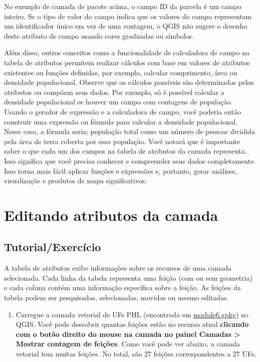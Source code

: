 \documentclass[
]{krantz}
\providecommand{\tightlist}{%
  \setlength{\itemsep}{0pt}\setlength{\parskip}{0pt}}
\begin{document}
No exemplo de camada de pacote acima, o campo ID da parcela é um campo inteiro. Se o tipo de valor do campo indica que os valores do campo representam um identificador único em vez de uma contagem, o QGIS não sugere o desenho deste atributo de campo usando cores graduadas ou símbolos.

Além disso, outros conceitos como a funcionalidade de calculadora de campo na tabela de atributos permitem realizar cálculos com base em valores de atributos existentes ou funções definidas, por exemplo, calcular comprimento, área ou densidade populacional. Observe que os cálculos possíveis são determinados pelos atributos ou compõem seus dados. Por exemplo, só é possível calcular a densidade populacional se houver um campo com contagens de população. Usando o gerador de expressão e a calculadora de campo, você poderia então construir uma expressão ou fórmula para calcular a densidade populacional. Nesse caso, a fórmula seria; população total como um número de pessoas dividida pela área de terra coberta por essa população. Você notará que é importante saber o que cada um dos campos na tabela de atributos da camada representa. Isso significa que você precisa conhecer e compreender seus dados completamente. Isso torna mais fácil aplicar funções e expressões e, portanto, gerar análises, visualizaçõe e produtos de mapa significativos.

\hypertarget{editando-atributos-da-camada}{%
\section{Editando atributos da camada}\label{editando-atributos-da-camada}}

\hypertarget{tutorialexercuxedcio-4}{%
\subsection{Tutorial/Exercício}\label{tutorialexercuxedcio-4}}

A tabela de atributos exibe informações sobre os recursos de uma camada selecionada. Cada linha da tabela representa uma feição (com ou sem geometria) e cada coluna contém uma informação específica sobre a feição. As feições da tabela podem ser pesquisadas, selecionadas, movidas ou mesmo editadas.

\begin{enumerate}
\def\labelenumi{\arabic{enumi}.}
\tightlist
\item
  Carregue a camada vetorial de UFs PHL (encontrada em \href{data/module6.gpkg}{module6.gpkg}) no QGIS. Você pode descobrir quantas feições estão no recurso atual \textbf{clicando com o botão direito do mouse na camada no painel Camadas \textgreater{} Mostrar contagem de feições}. Como você pode ver abaixo, a camada vetorial tem muitas feições. No total, são 27 feições correspondentes a 27 UFs.
\end{enumerate}
\end{document}
